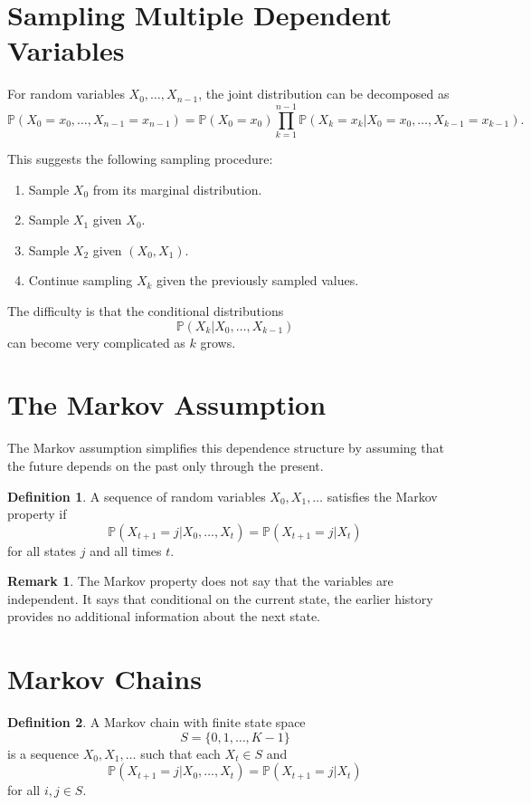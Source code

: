 \documentclass[12pt,oneside]{book}
\numberwithin{equation}{section}
\theoremstyle{definition}
\newtheorem{definition}{Definition}[section]
\newtheorem{remark}{Remark}[section]
\theoremstyle{plain}
\theoremstyle{remark}
\newcommand{\Prob}{\mathbb{P}}
\begin{document}
\section{Sampling Multiple Dependent Variables}

For random variables $X_0,\ldots,X_{n-1}$, the joint distribution can be decomposed as
\[
\Prob(X_0=x_0,\ldots,X_{n-1}=x_{n-1})
=
\Prob(X_0=x_0)
\prod_{k=1}^{n-1}
\Prob(X_k=x_k|X_0=x_0,\ldots,X_{k-1}=x_{k-1}).
\]

This suggests the following sampling procedure:
\begin{enumerate}
\item Sample $X_0$ from its marginal distribution.
\item Sample $X_1$ given $X_0$.
\item Sample $X_2$ given $(X_0,X_1)$.
\item Continue sampling $X_k$ given the previously sampled values.
\end{enumerate}

The difficulty is that the conditional distributions
\[
\Prob(X_k|X_0,\ldots,X_{k-1})
\]
can become very complicated as $k$ grows.

\section{The Markov Assumption}

The Markov assumption simplifies this dependence structure by assuming that the future depends on the past only through the present.

\begin{definition}
A sequence of random variables $X_0,X_1,\ldots$ satisfies the Markov property if
\[
\Prob(X_{t+1}=j|X_0,\ldots,X_t)
=
\Prob(X_{t+1}=j|X_t)
\]
for all states $j$ and all times $t$.
\end{definition}

\begin{remark}
The Markov property does not say that the variables are independent. It says that conditional on the current state, the earlier history provides no additional information about the next state.
\end{remark}

\section{Markov Chains}

\begin{definition}
A Markov chain with finite state space
\[
S=\{0,1,\ldots,K-1\}
\]
is a sequence $X_0,X_1,\ldots$ such that each $X_t\in S$ and
\[
\Prob(X_{t+1}=j|X_0,\ldots,X_t)
=
\Prob(X_{t+1}=j|X_t)
\]
for all $i,j\in S$.
\end{definition}
\end{document}
